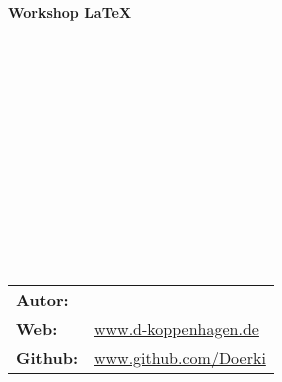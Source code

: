 \thispagestyle{empty}
\begin{center}
\end{center}
\begin{verbatim}


\end{verbatim}
\begin{center}
\textbf{\Huge{Workshop \LaTeX}}
\end{center}
\begin{verbatim}















\end{verbatim}
\begin{flushleft}
\begin{tabular}{p{5cm} l }
\textbf{Autor:} 	& \authorname \\
\textbf{Web:}  		& \url{www.d-koppenhagen.de} \\
\textbf{Github:}  	& \url{www.github.com/Doerki} \\
\end{tabular}
\end{flushleft}
